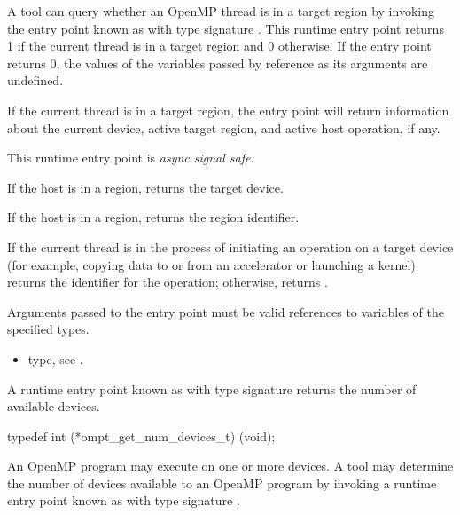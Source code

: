 \descr
A tool can query whether an OpenMP thread is in a target region by
invoking the entry point known as 
with type signature .
This runtime entry point returns 1 if the current thread is
in a target region and 0 otherwise. If the entry point returns 0,
the values of the variables passed by reference as its arguments
are undefined.

If the current thread is in a target region, the entry point will
return information about the current device, active target region, and
active host operation, if any.

This runtime entry point is \emph{async signal safe}.

\argdesc

If the host is in a  region,
 returns the target device.

If the host is in a  region,
 returns the  region identifier.

If the current thread is in the process of initiating an
operation on a target device (for example, copying data to or from an
accelerator or launching a kernel)  returns
the identifier for the operation; otherwise,
 returns .

\constraints

Arguments passed to the entry point must be valid
references to variables of the specified types.

\crossreferences
\begin{itemize}
\item {} type, see .
\end{itemize}

\label{sec:ompt_get_num_devices_t}
\label{sec:ompt_get_num_devices}

\summary
A runtime entry point known as 
with type signature 
returns the number of available devices.

\format
\begin{ccppspecific}
\begin{omptInquiry}
typedef int (*ompt_get_num_devices_t) (void);
\end{omptInquiry}
\end{ccppspecific}

\descr

An OpenMP program may execute on one or more devices.
A tool may determine the number of devices available to an OpenMP
program by invoking a runtime entry point
known as 
with type signature .

